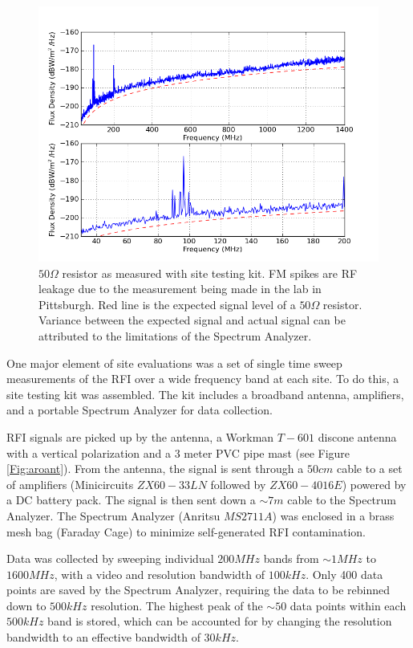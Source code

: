 \begin{figure}[htb]
\begin{center}
\includegraphics[width=0.9\linewidth]{RFI_testing/figures/50Ohm_cal.png}
\caption{$50 \Omega$ resistor as measured with site testing kit. FM spikes are RF leakage due to the measurement being made in the lab in Pittsburgh. Red line is the expected signal level of a $50 \Omega$ resistor. Variance between the expected signal and actual signal can be attributed to the limitations of the Spectrum Analyzer.}
\label{Fig:resflux}
\end{center}
\end{figure}

One major element of site evaluations was a set of single time sweep measurements of the RFI over a wide frequency band at each site. To do this, a site testing kit was assembled. The kit includes a broadband antenna, amplifiers, and a portable Spectrum Analyzer for data collection. 

RFI signals are picked up by the antenna, a Workman $T-601$ discone antenna with a vertical polarization and a 3 meter PVC pipe mast (see Figure \ref{Fig:aroant}). From the antenna, the signal is sent through a $50 cm$ cable to a set of amplifiers (Minicircuits $ZX60-33LN$ followed by $ZX60-4016E$) powered by a DC battery pack. The signal is then sent down a $\sim7 m$ cable to the Spectrum Analyzer. The Spectrum Analyzer (Anritsu $MS2711A$) was enclosed in a brass mesh bag (Faraday Cage) to minimize self-generated RFI contamination. 

Data was collected by sweeping individual $200 MHz$ bands from $\sim1 MHz$ to $1600 MHz$, with a video and resolution bandwidth of $100 kHz$. Only 400 data points are saved by the Spectrum Analyzer, requiring the data to be rebinned down to $500 kHz$ resolution. The highest peak of the $\sim50$ data points within each $500 kHz$ band is stored, which can be accounted for by changing the resolution bandwidth to an effective bandwidth of $30 kHz$. 

